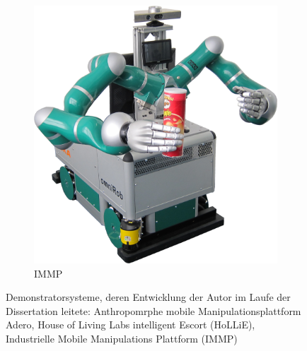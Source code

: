 \begin{figure}[hbtp]
\begin{subfigure}[t]{0.29\textwidth}
		\includegraphics[width=\textwidth]{04_images/robots/IMMP.png}
		\caption{IMMP}
		\label{subfig:IMMP}
	\end{subfigure}
	\caption{Demonstratorsysteme, deren Entwicklung der Autor im Laufe der Dissertation leitete:
		Anthropomrphe mobile Manipulationsplattform Adero, House of Living Labs intelligent Escort (HoLLiE),
		Industrielle Mobile Manipulations Plattform (IMMP)}
	\label{fig:own_robots}
\end{figure}



